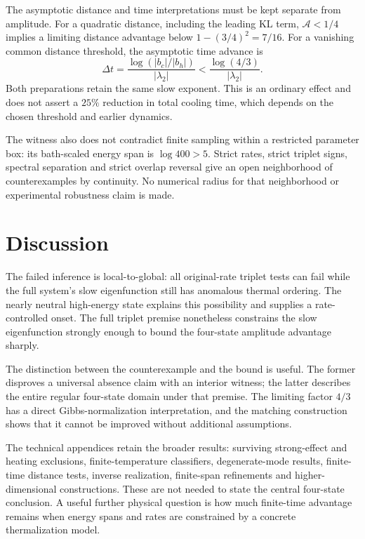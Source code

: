 \documentclass[11pt]{article}
\begin{document}
The asymptotic distance and time interpretations must be kept separate
from amplitude. For a quadratic distance, including the leading KL
term, $\mathcal A<1/4$ implies a limiting distance advantage below
$1-(3/4)^2=7/16$. For a vanishing common distance threshold, the
asymptotic time advance is
\[
 \Delta t=\frac{\log(|b_c|/|b_h|)}{|\lambda_2|}
 <\frac{\log(4/3)}{|\lambda_2|}.
\]
Both preparations retain the same slow exponent. This is an ordinary
effect and does not assert a $25\%$ reduction in total cooling time,
which depends on the chosen threshold and earlier dynamics.

The witness also does not contradict finite sampling within a restricted
parameter box: its bath-scaled energy span is $\log400>5$. Strict rates,
strict triplet signs, spectral separation and strict overlap reversal
give an open neighborhood of counterexamples by continuity. No numerical
radius for that neighborhood or experimental robustness claim is made.

\section{Discussion}
The failed inference is local-to-global: all original-rate triplet tests
can fail while the full system's slow eigenfunction still has anomalous
thermal ordering. The nearly neutral high-energy state explains this
possibility and supplies a rate-controlled onset. The full triplet
premise nonetheless constrains the slow eigenfunction strongly enough
to bound the four-state amplitude advantage sharply.

The distinction between the counterexample and the bound is useful.
The former disproves a universal absence claim with an interior witness;
the latter describes the entire regular four-state domain under that
premise. The limiting factor $4/3$ has a direct Gibbs-normalization
interpretation, and the matching construction shows that it cannot be
improved without additional assumptions.

The technical appendices retain the broader results: surviving
strong-effect and heating exclusions, finite-temperature classifiers,
degenerate-mode results, finite-time distance tests, inverse realization,
finite-span refinements and higher-dimensional constructions. These are
not needed to state the central four-state conclusion. A useful further
physical question is how much finite-time advantage remains when energy
spans and rates are constrained by a concrete thermalization model.
\end{document}
